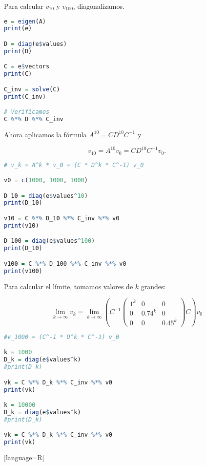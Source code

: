 \begin{ejemplo}
Para calcular $v_{10}$ y $v_{100}$, diagonalizamos.

\begin{lstlisting}[language=R]
e = eigen(A)
print(e)

D = diag(e$values)
print(D)

C = e$vectors
print(C)

C_inv = solve(C)
print(C_inv)

# Verificamos
C %*% D %*% C_inv
\end{lstlisting}

Ahora aplicamos la fórmula $A^{10} = C D^{10} C^{-1}$ y

$$
v_{10} = A^{10} v_0 = C D^{10} C^{-1} v_0.
$$

\begin{lstlisting}[language=R]
# v_k = A^k * v_0 = (C * D^k * C^-1) v_0

v0 = c(1000, 1000, 1000)

D_10 = diag(e$values^10)
print(D_10)

v10 = C %*% D_10 %*% C_inv %*% v0
print(v10)

D_100 = diag(e$values^100)
print(D_10)

v100 = C %*% D_100 %*% C_inv %*% v0
print(v100)
\end{lstlisting}

Para calcular el límite, tomamos valores de $k$ grandes:

$$
\lim_{k \rightarrow \infty} v_k = \lim_{k \rightarrow \infty} \left( C^{-1} \begin{pmatrix} 1^k & 0 & 0 \\ 0 & 0.74^k & 0 \\ 0 & 0 & 0.45^k \end{pmatrix} C \right)v_0
$$

\begin{lstlisting}[language=R]
#v_1000 = (C^-1 * D^k * C^-1) v_0

k = 1000
D_k = diag(e$values^k)
#print(D_k)

vk = C %*% D_k %*% C_inv %*% v0
print(vk)

k = 10000
D_k = diag(e$values^k)
#print(D_k)

vk = C %*% D_k %*% C_inv %*% v0
print(vk)

\end{lstlisting}[language=R]

\end{ejemplo}
